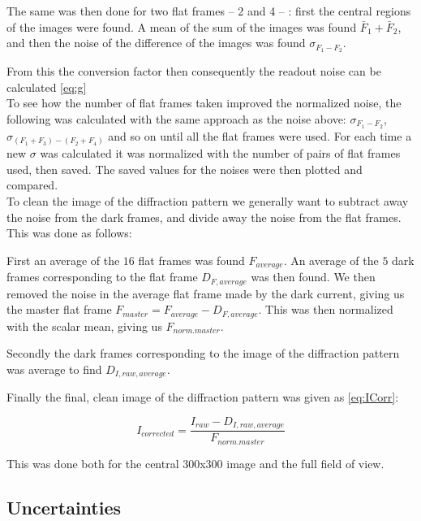 \documentclass{emulateapj}
\begin{document}
The same was then done for two flat frames -- 2 and 4 -- : first the central regions of the images were found. A mean of the sum of the images was found $\bar{F}_1 + \bar{F}_2$, and then the noise of the difference of the images was found $\sigma_{F_1 - F_2}$.

From this the conversion factor then consequently the readout noise can be calculated \eqref{eq:g}\\

To see how the number of flat frames taken improved the normalized noise, the following was calculated with the same approach as the noise above:
$\sigma_{F_1-F_2}$, $\sigma_{(F_1 + F_3) - (F_2+F_4)}$ and so on until all the flat frames were used. For each time a new $\sigma$ was calculated it was normalized with the number of pairs of flat frames used, then saved. The saved values for the noises were then plotted and compared.\\

To clean the image of the diffraction pattern we generally want to subtract away the noise from the dark frames, and divide away the noise from the flat frames. This was done as follows:

First an average of the $16$ flat frames was found $F_{average}$. An average of the $5$ dark frames corresponding to the flat frame $D_{F,average}$ was then found. We then removed the noise in the average flat frame made by the dark current, giving us the master flat frame $F_{master} = F_{average}-D_{F,average}$. This was then normalized with the scalar mean, giving us $F_{norm. master}$.

Secondly the dark frames corresponding to the image of the diffraction pattern was average to find $D_{I,raw,average}$. 

Finally the final, clean image of the diffraction pattern was given as \eqref{eq:ICorr}:

\begin{equation}
I_{corrected} = \frac{I_{raw} - D_{I,raw,average}}{F_{norm. master}}
\end{equation}

This was done both for the central 300x300 image and the full field of view.



\subsection{Uncertainties}
\end{document}
